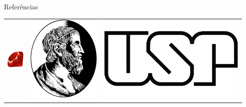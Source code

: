 \documentclass[final]{beamer}
\newlength{\sepwid}
\newlength{\onecolwid}
\begin{document}
\begin{frame}[t]
\begin{columns}[t]
\begin{column}{\onecolwid}
\begin{block}{Referências}

\nocite{*} %
\small{
}

\end{block}


\begin{center}
\begin{tabular}{ccc}
\includegraphics[width=0.12\linewidth]{ruby.png} & \includegraphics[width=0.12\linewidth]{IME.png} & \includegraphics[width=0.25\linewidth]{USP.jpg}
\end{tabular}
\end{center}


\end{column} %

\begin{column}{\sepwid}\end{column} %

\end{columns} %

\end{frame} %
\end{document}
